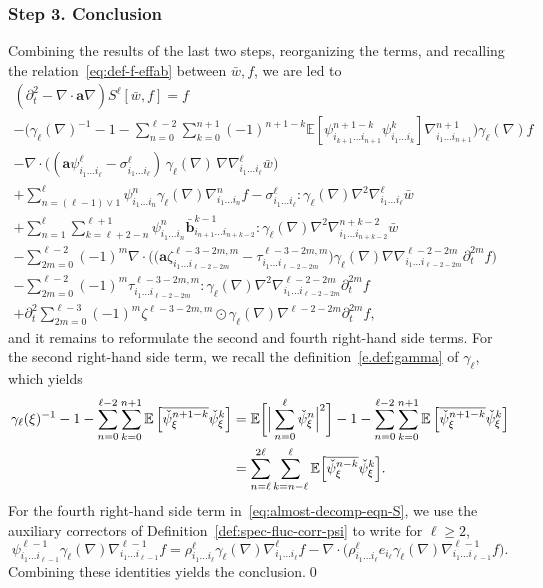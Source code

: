 \documentclass[10pt]{amsart}
\theoremstyle{plain}
\theoremstyle{definition}
\numberwithin{equation}{section}
\newcommand{\E}{\mathbb E}
\newcommand{\Aa}{\boldsymbol a}
\newcommand{\bb}{{\boldsymbol b}}
\newcommand{\step}[1]{\subsubsection*{Step \textup #1}}
\newcommand{\expec}[1]{\mathbb{E}\left[ #1 \right]}
\newcommand{\Bexpec}[1]{\mathbb{E}\Bigl[ #1 \Bigr]}
\begin{document}
\step{3. Conclusion}
Combining the results of the last two steps, reorganizing the terms, and recalling the relation~\eqref{eq:def-f-effab} between $\bar w,f$, we are led to
\begin{multline}\label{eq:almost-decomp-eqn-S}
(\partial_t^2-\nabla \cdot \Aa \nabla) S^\ell[\bar w,f]
=f\\
-\bigg(\gamma_\ell(\nabla)^{-1}-1-\sum_{n=0}^{\ell-2}\sum_{k=0}^{n+1}(-1)^{n+1-k}\expec{\psi^{n+1-k}_{i_{k+1}\ldots i_{n+1}}\psi^k_{i_{1}\ldots i_k}}\nabla^{n+1}_{i_1\ldots i_{n+1}}\bigg)\gamma_{\ell}(\nabla)f\\
- \nabla \cdot \Big((\Aa \psi^\ell_{i_1\ldots i_\ell}-\sigma^\ell_{i_1\ldots i_\ell})\,\gamma_\ell(\nabla)\,\nabla\nabla^{\ell}_{i_1\ldots i_{\ell}}\bar w\Big)\\
+\sum_{n=(\ell-1)\vee1}^\ell \psi^n_{i_1\ldots i_n} \gamma_\ell(\nabla) \nabla^n_{i_1\ldots i_n}f-\sigma^\ell_{i_1\ldots i_{\ell}}: \gamma_\ell(\nabla) \nabla^2\nabla^{\ell}_{i_1\ldots i_{\ell}} \bar w
\\
+\sum_{n=1}^\ell \sum_{k=\ell+2-n}^{\ell+1} \psi^n_{i_1\ldots i_n} \bar \bb^{k-1}_{i_{n+1}\ldots i_{n+k-2}}:\gamma_\ell(\nabla)\nabla^2\nabla_{i_1\ldots i_{n+k-2}}^{n+k-2}\bar w\\
-\sum_{2m=0}^{\ell-2}(-1)^m\nabla\cdot\Big(\big(\Aa\zeta^{\ell-3-2m,m}_{i_1\ldots i_{\ell-2-2m}}-\tau^{\ell-3-2m,m}_{i_1\ldots i_{\ell-2-2m}}\big)\gamma_{\ell}(\nabla)\nabla\nabla^{\ell-2-2m}_{i_1\ldots i_{\ell-2-2m}}\partial_t^{2m} f\Big)\\
-\sum_{2m=0}^{\ell-2}(-1)^m\tau^{\ell-3-2m,m}_{i_1\ldots i_{\ell-2-2m}}:\gamma_{\ell}(\nabla)\nabla^2\nabla^{\ell-2-2m}_{i_1\ldots i_{\ell-2-2m}}\partial_t^{2m} f\\
+\partial_t^2\sum_{2m=0}^{\ell-3}(-1)^m\zeta^{\ell-3-2m,m}\odot\gamma_{\ell}(\nabla)\nabla^{\ell-2-2m}\partial_t^{2m} f,
\end{multline}
and it remains to reformulate the second and fourth right-hand side terms.
For the second right-hand side term, we recall the definition~\eqref{e.def:gamma} of $\gamma_\ell$, which yields
\begin{align*}
\gamma_\ell(\xi)^{-1}-1-\sum_{n=0}^{\ell-2}\sum_{k=0}^{n+1}\expec{\overline{\check\psi_\xi^{n+1-k}}\check\psi_\xi^k}
&=\E\bigg[{\Big|\sum_{n=0}^{\ell} \check\psi_\xi^n\Big|^2}\bigg]-1-\sum_{n=0}^{\ell-2}\sum_{k=0}^{n+1}\expec{\overline{\check\psi_\xi^{n+1-k}}\check\psi_\xi^k}\\
&=\sum_{n=\ell}^{2\ell}\sum_{k=n-\ell}^{\ell}\Bexpec{\overline{\check\psi_\xi^{n-k}}\check\psi_\xi^k}.
\end{align*}
For the fourth right-hand side term in~\eqref{eq:almost-decomp-eqn-S}, we use the auxiliary correctors of Definition~\ref{def:spec-fluc-corr-psi} to write for $\ell\ge2$,
\[\psi^{\ell-1}_{i_1\ldots i_{\ell-1}} \gamma_\ell(\nabla) \nabla^{\ell-1}_{i_1\ldots i_{\ell-1}}f=
\rho^{\ell}_{i_1\ldots i_{\ell}}\gamma_\ell(\nabla) \nabla^{\ell}_{i_1\ldots i_{\ell}}f
-\nabla\cdot\Big(\rho^{\ell}_{i_1\ldots i_{\ell}}e_{i_\ell}\gamma_\ell(\nabla) \nabla^{\ell-1}_{i_1\ldots i_{\ell-1}}f\Big).\]
Combining these identities yields the conclusion.\qed
\end{document}
